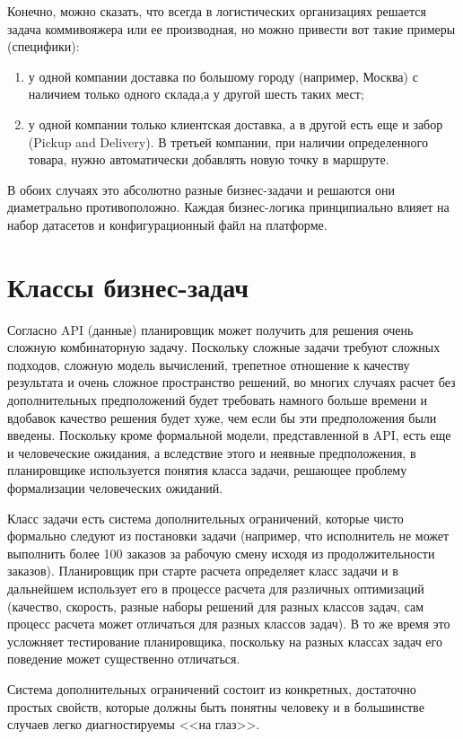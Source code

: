 Конечно, можно сказать, что всегда в логистических организациях  решается задача коммивояжера или ее производная, но можно привести вот такие примеры (специфики):
\begin{enumerate}
	\item у одной компании доставка по большому городу (например, Москва) с наличием только одного склада,а у другой шесть таких мест;
    \item у одной компании только клиентская доставка, а в другой есть еще и забор (Pickup and Delivery). В третьей компании, при наличии определенного товара, нужно автоматически добавлять новую точку в маршруте.
\end{enumerate}
В обоих случаях это абсолютно разные бизнес-задачи и решаются они диаметрально противоположно.
Каждая бизнес-логика принципиально влияет на набор датасетов и конфигурационный файл на платформе.


\section{Классы бизнес-задач}

Согласно API (данные) планировщик может получить для решения очень сложную комбинаторную задачу. Поскольку сложные задачи требуют сложных подходов, сложную модель вычислений, трепетное отношение к качеству результата и очень сложное пространство решений, во многих случаях расчет без дополнительных предположений будет требовать намного больше времени и вдобавок качество решения будет хуже, чем если бы эти предположения были введены. Поскольку кроме формальной модели, представленной в API, есть еще и человеческие ожидания, а вследствие этого и неявные предположения, в планировщике используется понятия класса задачи, решающее проблему формализации человеческих ожиданий.

Класс задачи есть система дополнительных ограничений, которые чисто формально следуют из постановки задачи (например, что исполнитель не может выполнить более 100 заказов за рабочую смену исходя из продолжительности заказов). Планировщик при старте расчета определяет класс задачи и в дальнейшем использует его в процессе расчета для различных оптимизаций (качество, скорость, разные наборы решений для разных классов задач, сам процесс расчета может отличаться для разных классов задач). В то же время это усложняет тестирование планировщика, поскольку на разных классах задач его поведение может существенно отличаться.

Система дополнительных ограничений состоит из конкретных, достаточно простых свойств, которые должны быть понятны человеку и в большинстве случаев легко диагностируемы <<на глаз>>.


